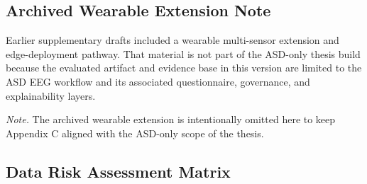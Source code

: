 

\subsection{Archived Wearable Extension Note}
\label{sec:wearable_sensors}

\label{tab:wearable_sensors}
\label{fig:edge_deployment}
Earlier supplementary drafts included a wearable multi-sensor extension and edge-deployment pathway. That material is not part of the ASD-only thesis build because the evaluated artifact and evidence base in this version are limited to the ASD EEG workflow and its associated questionnaire, governance, and explainability layers.

\noindent\textit{Note.} The archived wearable extension is intentionally omitted here to keep Appendix C aligned with the ASD-only scope of the thesis.



\subsection{Data Risk Assessment Matrix}
\label{sec:data_risk_matrix}

